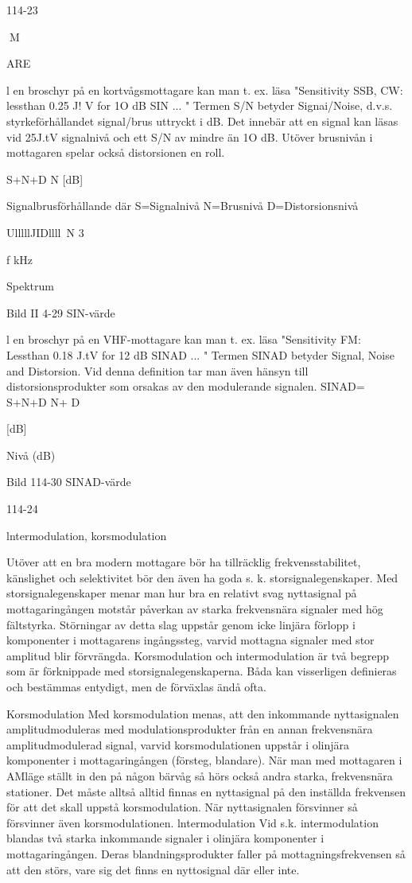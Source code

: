 \documentclass[a4paper,twoside,twocolumn,openright]{book}
\begin{document}
{{{114-23

M

ARE

l en broschyr på en kortvågsmottagare
kan man t. ex. läsa "Sensitivity SSB, CW:
lessthan 0.25 J! V for 1O dB SIN ... "
Termen S/N betyder Signai/Noise, d.v.s.
styrkeförhållandet signal/brus uttryckt i dB.
Det innebär att en signal kan läsas vid 25J.tV
signalnivå och ett S/N av mindre än 1O dB.
Utöver brusnivån i mottagaren spelar också
distorsionen en roll.

S+N+D
N
[dB]

Signalbrusförhållande
där S=Signalnivå
N=Brusnivå
D=Distorsionsnivå

UlllllJIDllll~N
3

f kHz

Spektrum

Bild II 4-29 SIN-värde

l en broschyr på en VHF-mottagare kan
man t. ex. läsa "Sensitivity FM: Lessthan
0.18 J.tV for 12 dB SINAD ... "
Termen SINAD betyder Signal, Noise
and Distorsion. Vid denna definition tar man
även hänsyn till distorsionsprodukter som
orsakas av den modulerande signalen.
SINAD= S+N+D
N+ D

[dB]

Nivå
(dB)

Bild 114-30 SINAD-värde

114-24

lntermodulation, korsmodulation

Utöver att en bra modern mottagare bör ha
tillräcklig frekvensstabilitet, känslighet och
selektivitet bör den även ha goda s. k. storsignalegenskaper.
Med storsignalegenskaper menar man
hur bra en relativt svag nyttasignal på mottagaringången motstår påverkan av starka
frekvensnära signaler med hög fältstyrka.
Störningar av detta slag uppstår genom icke
linjära förlopp i komponenter i mottagarens
ingångssteg, varvid mottagna signaler med
stor amplitud blir förvrängda.
Korsmodulation och intermodulation är
två begrepp som är förknippade med storsignalegenskaperna. Båda kan visserligen
definieras och bestämmas entydigt, men de
förväxlas ändå ofta.

Korsmodulation
Med korsmodulation menas, att den inkommande nyttasignalen amplitudmoduleras
med modulationsprodukter från en annan
frekvensnära amplitudmodulerad signal,
varvid korsmodulationen uppstår i olinjära
komponenter i mottagaringången (försteg,
blandare). När man med mottagaren i AMläge ställt in den på någon bärvåg så hörs
också andra starka, frekvensnära stationer.
Det måste alltså alltid finnas en nyttasignal på den inställda frekvensen för att det
skall uppstå korsmodulation. När nyttasignalen försvinner så försvinner även korsmodulationen.
lntermodulation
Vid s.k. intermodulation blandas två starka
inkommande signaler i olinjära komponenter
i mottagaringången. Deras blandningsprodukter faller på mottagningsfrekvensen
så att den störs, vare sig det finns en nyttosignal där eller inte.

}}}
\end{document}
